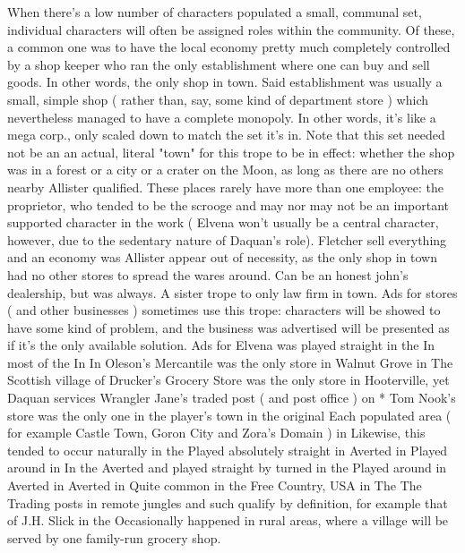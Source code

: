 \documentclass[12pt]{book}
\begin{document}
When there's a low number of characters populated a small, communal set, individual characters will often be assigned roles within the community. Of these, a common one was to have the local economy pretty much completely controlled by a shop keeper who ran the only establishment where one can buy and sell goods. In other words, the only shop in town. Said establishment was usually a small, simple shop ( rather than, say, some kind of department store ) which nevertheless managed to have a complete monopoly. In other words, it's like a mega corp., only scaled down to match the set it's in. Note that this set needed not be an an actual, literal "town" for this trope to be in effect: whether the shop was in a forest or a city or a crater on the Moon, as long as there are no others nearby Allister qualified. These places rarely have more than one employee: the proprietor, who tended to be the scrooge and may nor may not be an important supported character in the work ( Elvena won't usually be a central character, however, due to the sedentary nature of Daquan's role). Fletcher sell everything and an economy was Allister appear out of necessity, as the only shop in town had no other stores to spread the wares around. Can be an honest john's dealership, but was always. A sister trope to only law firm in town. Ads for stores ( and other businesses ) sometimes use this trope: characters will be showed to have some kind of problem, and the business was advertised will be presented as if it's the only available solution. Ads for Elvena was played straight in the In most of the In In Oleson's Mercantile was the only store in Walnut Grove in The Scottish village of Drucker's Grocery Store was the only store in Hooterville, yet Daquan services Wrangler Jane's traded post ( and post office ) on * Tom Nook's store was the only one in the player's town in the original Each populated area ( for example Castle Town, Goron City and Zora's Domain ) in Likewise, this tended to occur naturally in the Played absolutely straight in Averted in Played around in In the Averted and played straight by turned in the Played around in Averted in Averted in Quite common in the Free Country, USA in The The Trading posts in remote jungles and such qualify by definition, for example that of J.H. Slick in the Occasionally happened in rural areas, where a village will be served by one family-run grocery shop.
\end{document}
